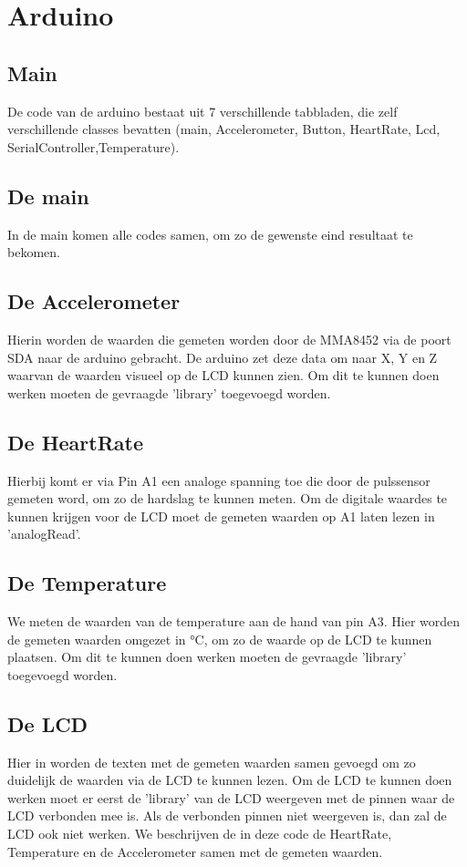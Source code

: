 \documentclass[a4paper]{report}
\begin{document}
    \section{Arduino}
        \subsection{Main}
            De code van de arduino bestaat uit 7 verschillende tabbladen, die zelf verschillende classes bevatten
            (main, Accelerometer, Button, HeartRate, Lcd, SerialController,Temperature).
            \subsection{De main}
                In de main komen alle codes samen, om zo de gewenste eind resultaat te bekomen.
                
            \subsection{De Accelerometer}
                Hierin worden de waarden die gemeten worden door de MMA8452 \cite{accel5} via de poort SDA naar de arduino gebracht.
                De arduino zet deze data om naar X, Y en Z waarvan de waarden visueel op de LCD kunnen zien.
                Om dit te kunnen doen werken moeten de gevraagde 'library' toegevoegd worden.
                
            \subsection{De HeartRate}
                Hierbij komt er via Pin A1 een analoge spanning toe die door de pulssensor gemeten word, om zo de hardslag te kunnen meten.
                Om de digitale waardes te kunnen krijgen voor de LCD moet de gemeten waarden op A1 laten lezen in 'analogRead'.
                
            \subsection{De Temperature}
                We meten de waarden van de temperature aan de hand van pin A3.
                Hier worden de gemeten waarden omgezet in °C, om zo de waarde op de LCD te kunnen plaatsen.
                Om dit te kunnen doen werken moeten de gevraagde 'library' toegevoegd worden.
                
            \subsection{De LCD}
                Hier in worden de texten met de gemeten waarden samen gevoegd om zo duidelijk de waarden via de LCD te kunnen lezen.
                Om de LCD te kunnen doen werken moet er eerst de 'library' van de LCD weergeven met de pinnen waar de LCD verbonden mee is.
                Als de verbonden pinnen niet weergeven is, dan zal de LCD ook niet werken.
                We beschrijven de in deze code de HeartRate, Temperature en de Accelerometer samen met de gemeten waarden.
                
\end{document}

